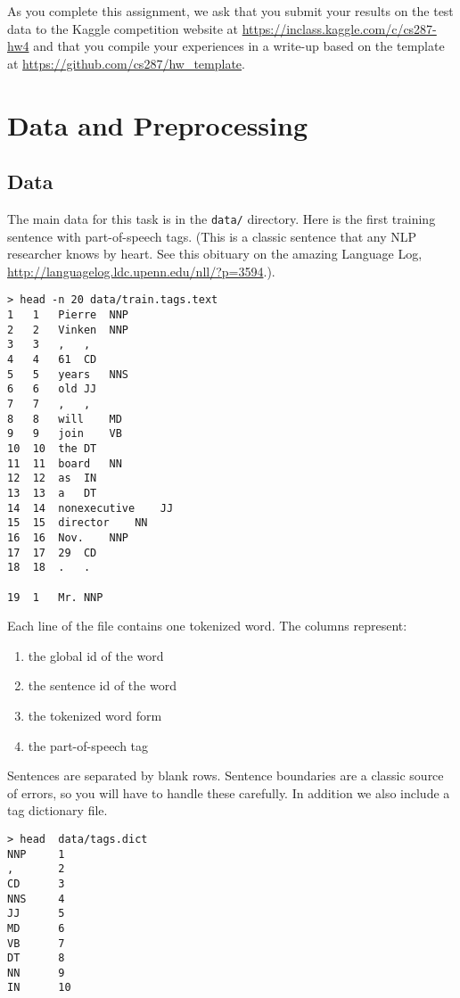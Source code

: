 \documentclass[11pt]{article}
\begin{document}
As you complete this assignment, we ask that you submit your results
on the test data to the Kaggle competition website at
\url{https://inclass.kaggle.com/c/cs287-hw4} and that you compile your
experiences in a write-up based on the template at
\url{https://github.com/cs287/hw_template}.

\section{Data and Preprocessing}

\subsection{Data}

The main data for this task is in the \texttt{data/} directory. Here
is the first training sentence with part-of-speech tags. (This is a
classic sentence that any NLP researcher knows by heart. See this obituary on
the amazing Language Log, 
\url{http://languagelog.ldc.upenn.edu/nll/?p=3594}.).

\begin{verbatim}
> head -n 20 data/train.tags.text
1	1	Pierre	NNP
2	2	Vinken	NNP
3	3	,	,
4	4	61	CD
5	5	years	NNS
6	6	old	JJ
7	7	,	,
8	8	will	MD
9	9	join	VB
10	10	the	DT
11	11	board	NN
12	12	as	IN
13	13	a	DT
14	14	nonexecutive	JJ
15	15	director	NN
16	16	Nov.	NNP
17	17	29	CD
18	18	.	.

19	1	Mr.	NNP
\end{verbatim}

\vspace{0.5cm}

Each line of the file contains one tokenized word. The columns represent:

\begin{enumerate}
\item the global id of the word
\item the sentence id of the word
\item the tokenized word form
\item the part-of-speech tag
\end{enumerate}

\noindent Sentences are separated by blank rows. Sentence boundaries are a
classic source of errors, so you will have to handle these carefully. In addition we also include a tag dictionary file. 

\begin{verbatim}
> head  data/tags.dict 
NNP     1
,       2
CD      3
NNS     4
JJ      5
MD      6
VB      7
DT      8
NN      9
IN      10
\end{verbatim}
\end{document}
